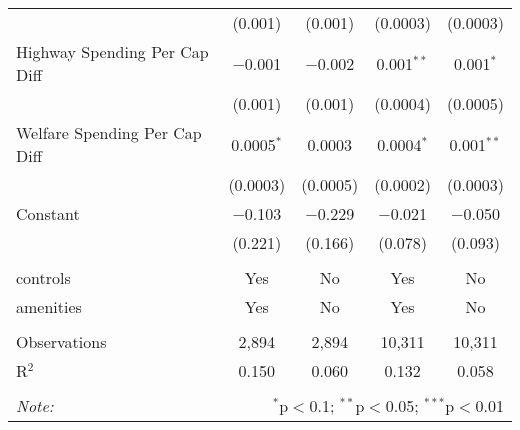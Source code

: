 \begin{table}[!htbp]
\begin{tabular}{@{\extracolsep{5pt}}lcccc}
  & (0.001) & (0.001) & (0.0003) & (0.0003) \\ 
  Highway Spending Per Cap Diff & $-$0.001 & $-$0.002 & 0.001$^{**}$ & 0.001$^{*}$ \\ 
  & (0.001) & (0.001) & (0.0004) & (0.0005) \\ 
  Welfare Spending Per Cap Diff & 0.0005$^{*}$ & 0.0003 & 0.0004$^{*}$ & 0.001$^{**}$ \\ 
  & (0.0003) & (0.0005) & (0.0002) & (0.0003) \\ 
  Constant & $-$0.103 & $-$0.229 & $-$0.021 & $-$0.050 \\ 
  & (0.221) & (0.166) & (0.078) & (0.093) \\ 
 \hline \\[-1.8ex] 
controls & Yes & No & Yes & No \\ 
amenities & Yes & No & Yes & No \\ 
\hline \\[-1.8ex] 
Observations & 2,894 & 2,894 & 10,311 & 10,311 \\ 
R$^{2}$ & 0.150 & 0.060 & 0.132 & 0.058 \\ 
\hline 
\hline \\[-1.8ex] 
\textit{Note:}  & \multicolumn{4}{r}{$^{*}$p$<$0.1; $^{**}$p$<$0.05; $^{***}$p$<$0.01} \\ 
\end{tabular} 
\end{table} 
